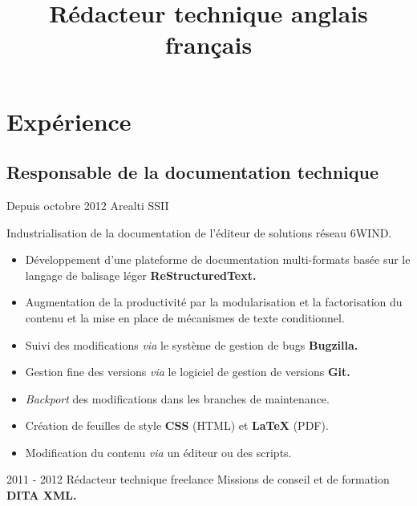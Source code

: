 \documentclass[12pt,a4paper,roman]{moderncv}
\title
    {Rédacteur technique anglais français}
\begin{document}
\makecvtitle %


\section{Expérience}

\subsection{Responsable de la documentation technique}

\cventry
    {Depuis octobre 2012}
    {Arealti}
    {SSII}
    {}
    {}
    {Industrialisation de la documentation de l'éditeur de solutions réseau
      6WIND.
      \begin{itemize}
      \item Développement d'une plateforme de documentation multi-formats
        basée sur le langage de balisage léger \textbf{ReStructuredText.}
      \item Augmentation de la productivité par la modularisation et la
        factorisation du contenu et la mise en place de mécanismes de texte
        conditionnel.
      \item Suivi des modifications \textit{via} le système de gestion de
        bugs \textbf{Bugzilla.}
      \item Gestion fine des versions \textit{via} le logiciel de gestion de
        versions \textbf{Git.}
      \item \textit{Backport} des modifications dans les branches de
        maintenance.
      \item Création de feuilles de style \textbf{CSS} (HTML) et
        \textbf{\LaTeX} (PDF).
      \item Modification du contenu \textit{via} un éditeur ou des scripts.
      \end{itemize}
    }


\cventry
    {2011 - 2012}
    {Rédacteur technique freelance}
    {\textsc{}}
    {}
    {}
    {Missions de conseil et de formation \textbf{DITA XML.}}

\end{document}
